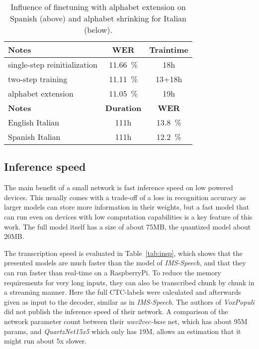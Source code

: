 \documentclass[a4paper]{article}
\begin{document}
\begin{table}[H]
	\caption{Influence of finetuning with alphabet extension on Spanish (above) and alphabet shrinking for Italian (below).}
	\label{tab:iae}
	\centering
	\begin{tabular}{lcc}
		\toprule
		\textbf{Notes} & \textbf{WER} & \textbf{Traintime} \\
		\midrule
		single-step reinitialization & \SI{11.66}{\percent} & 18h \\
		two-step training & \SI{11.11}{\percent} & 13+18h \\
		
		alphabet extension & \SI{11.05}{\percent} & 19h \\ 
		\midrule
		\textbf{Notes}  & \textbf{Duration} & \textbf{WER} \\
		\midrule
		English  Italian & 111h  & \SI{13.8}{\percent} \\
		Spanish  Italian & 111h  & \SI{12.2}{\percent} \\
		\bottomrule
	\end{tabular}
\end{table}

\subsection{Inference speed}
The main benefit of a small network is fast inference speed on low powered devices. This usually comes with a trade-off of a loss in recognition accuracy as larger models can store more information in their weights, but a fast model that can run even on devices with low computation capabilities is a key feature of this work. The full model itself has a size of about 75MB, the quantized model about 20MB.

The transcription speed is evaluated in Table~\ref{tab:insp}, which shows that the presented models are much faster than the model of \textit{IMS-Speech}, and that they can run faster than real-time on a RaspberryPi. To reduce the memory requirements for very long inputs, they can also be transcribed chunk by chunk in a streaming manner. Here the full CTC-labels were calculated and afterwards given as input to the decoder, similar as in \textit{IMS-Speech}.
The authors of \textit{VoxPopuli} did not publish the inference speed of their network. A comparison of the network parameter count between their \textit{wav2vec-base} net, which has about 95M params, and \textit{QuartzNet15x5} which only has 19M, allows an estimation that it might run about 5x slower.
\end{document}

